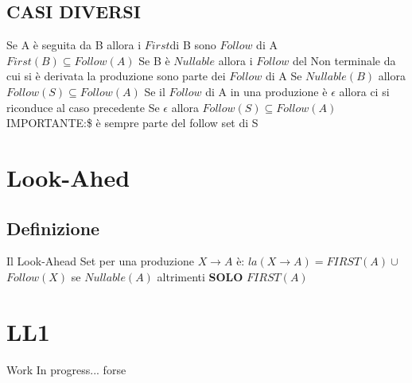 \documentclass{article}
\begin{document}
        \subsection{CASI DIVERSI}
            Se A è seguita da B allora i $First$di B sono $Follow$ di A \newline
            $First(B) \subseteq Follow(A)$\newline\newline
            Se B è $Nullable$ allora i $Follow$ del Non terminale da cui si è derivata la produzione sono parte dei $Follow$ di A
            Se $Nullable(B)$ allora $Follow(S) \subseteq Follow(A)$
            Se il $Follow$ di A in una produzione è $\epsilon$ allora ci si riconduce al caso precedente\newline
            Se $\epsilon$ allora $Follow(S) \subseteq Follow(A)$\newline
            IMPORTANTE:\$ è sempre parte del follow set di S
    
    \section{Look-Ahed}
        \subsection*{Definizione}

        Il Look-Ahead Set per una produzione $X\to A$ è:
        \newline
        $la(X\to A)=FIRST(A)\cup $ $Follow(X)$ se $Nullable(A)$ altrimenti  \textbf{SOLO} $FIRST(A)$
        
            
    \section{LL1}
    
    Work In progress... forse
        
        
\end{document}
